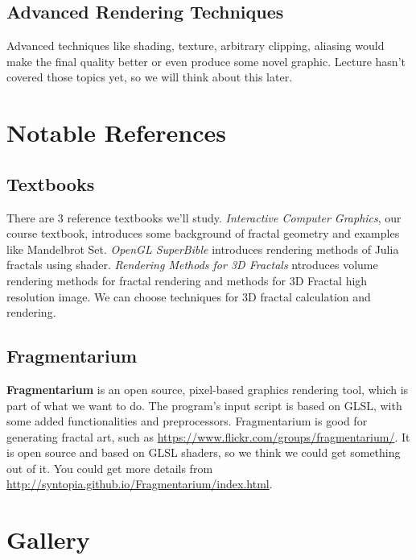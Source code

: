 \documentclass[a4paper]{article}
\begin{document}
\subsection{Advanced Rendering Techniques}
Advanced techniques like shading, texture, arbitrary clipping, aliasing would make the final quality better or even produce some novel graphic.
Lecture hasn't covered those topics yet, so we will think about this later.
\section{Notable References}
\subsection{Textbooks}
There are 3 reference textbooks we'll study.
\textit{Interactive Computer Graphics}\cite{c1}, our course textbook, introduces some background of fractal geometry and examples like Mandelbrot Set.
\textit{OpenGL SuperBible}\cite{c2} introduces rendering methods of Julia fractals using shader.
\textit{Rendering Methods for 3D Fractals}\cite{c3} ntroduces volume rendering methods for fractal rendering and methods for 3D Fractal high resolution image. We can choose techniques for 3D fractal calculation and rendering.

\subsection{Fragmentarium}
\textbf{Fragmentarium} is an open source, pixel-based graphics rendering tool, which is part of what we want to do.
The program's input script is based on GLSL, with some added functionalities and preprocessors.
Fragmentarium is good for generating fractal art, such as \url{https://www.flickr.com/groups/fragmentarium/}.
It is open source and based on GLSL shaders, so we think we could get something out of it.
You could get more details from \url{http://syntopia.github.io/Fragmentarium/index.html}.

\section{Gallery}
\begin{figure}[H]
\centering
{}
\end{figure}
\end{document}
